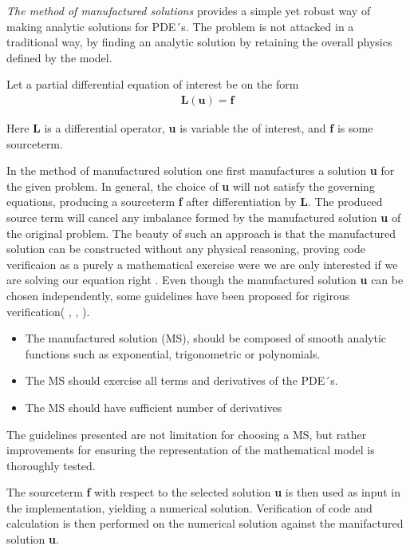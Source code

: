 \textit{The method of manufactured solutions} provides a simple yet robust way of making analytic solutions for PDE´s. The problem is not attacked in a traditional way, by finding an analytic solution by retaining the overall physics defined by the model. 

Let a  partial differential equation of interest be on the form
\begin{align*}
\textbf{L}(\textbf{u}) = \textbf{f}
\end{align*}

Here \textbf{L} is a differential operator, \textbf{u} is variable the of interest, and \textbf{f} is some sourceterm.

In the method of manufactured solution one first manufactures a solution \textbf{u} for the given problem. In general, the choice of \textbf{u} will not satisfy the governing equations, producing a sourceterm  \textbf{f} after differentiation by \textbf{L}. The produced source term will cancel any imbalance formed by the manufactured solution \textbf{u} of the original problem. The beauty of such an approach is that the manufactured solution can be constructed without any physical reasoning, proving code verificaion as a purely a mathematical exercise were we are only interested if we are solving our equation right \cite{Roache2002}. Even though the manufactured solution \textbf{u} can be chosen independently, some guidelines have been proposed for rigirous verification( \cite{Etienne2006}, \cite{Biggs}, \cite{Roache2002}). 

\begin{itemize}
\item The manufactured solution (MS), should be composed of smooth analytic functions such as exponential, trigonometric or polynomials.
\item The MS should exercise all terms and derivatives of the PDE´s. 
\item The MS should have sufficient number of derivatives
\end{itemize}
The guidelines presented are not limitation for choosing a MS, but rather improvements for ensuring the representation of the mathematical model is thoroughly tested. 

 The sourceterm \textbf{f} with respect to the selected solution \textbf{u} is then used as input in the implementation, yielding a numerical solution. Verification of code and calculation is then performed on the numerical solution against the manifactured solution \textbf{u}.  \\ 


